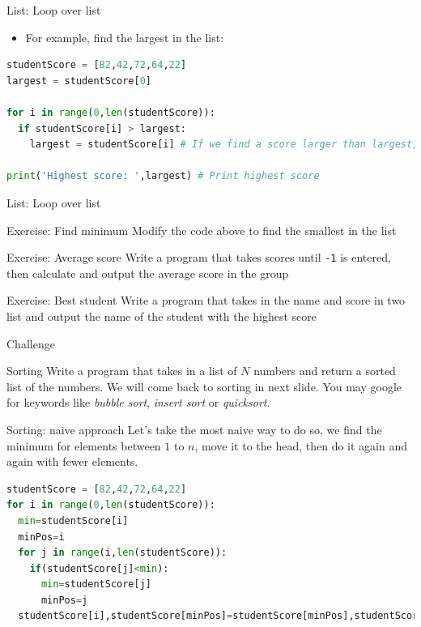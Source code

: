 \documentclass[10pt,xcolor={table,dvipsnames},t]{beamer}
\begin{document}
\begin{frame}[fragile]{List: Loop over list}
  \begin{itemize}
    \item For example, find the largest in the list:
  \end{itemize}
\begin{lstlisting}[language=python]
studentScore = [82,42,72,64,22]
largest = studentScore[0]

for i in range(0,len(studentScore)):
  if studentScore[i] > largest:
    largest = studentScore[i] # If we find a score larger than largest, update largest score 
  
print('Highest score: ',largest) # Print highest score
\end{lstlisting}
\end{frame}

\begin{frame}{List: Loop over list}
  \begin{exampleblock}{Exercise: Find minimum}
    Modify the code above to find the smallest in the list
  \end{exampleblock}
  \begin{exampleblock}{Exercise: Average score}
    Write a program that takes scores until \texttt{-1} is entered, then calculate and output the average score in the group
  \end{exampleblock}
  \begin{exampleblock}{Exercise: Best student}
    Write a program that takes in the name and score in two list and output the name of the student with the highest score
  \end{exampleblock}
\end{frame}


\begin{frame}{Challenge}
  \begin{exampleblock}{Sorting}
    Write a program that takes in a list of $N$ numbers and return a sorted list of the numbers. We will come back to sorting in next slide. You may google for keywords like \textit{bubble sort}, \textit{insert sort} or \textit{quicksort}.
  \end{exampleblock}
\end{frame}

\begin{frame}[fragile]{Sorting: naive approach}
Let's take the most naive way to do so, we find the minimum for elements between $1$ to $n$, move it to the head, then do it again and again with fewer elements. 
\begin{lstlisting}[language=python]
studentScore = [82,42,72,64,22]
for i in range(0,len(studentScore)):
  min=studentScore[i]
  minPos=i
  for j in range(i,len(studentScore)):
    if(studentScore[j]<min):
      min=studentScore[j]
      minPos=j
  studentScore[i],studentScore[minPos]=studentScore[minPos],studentScore[i]
\end{lstlisting}
\end{frame}
\end{document}
